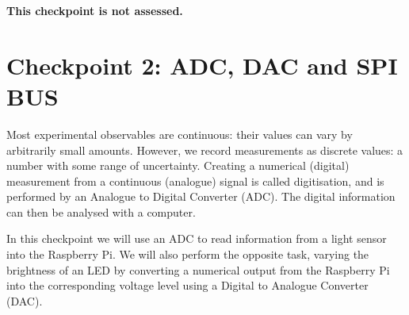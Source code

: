 {\bf This checkpoint is not assessed.}


\newpage
\section{Checkpoint 2: ADC, DAC and SPI BUS}

Most experimental observables are continuous: their values can vary by arbitrarily small amounts.
However, we record measurements as discrete values: a number with some range of uncertainty.
Creating a numerical (digital) measurement from a continuous (analogue) signal is called digitisation, and is performed by an Analogue to Digital Converter (ADC).
The digital information can then be analysed with a computer.

In this checkpoint we will use an ADC to read information from a light sensor into the Raspberry Pi.
We will also perform the opposite task, varying the brightness of an LED by converting a numerical output from the Raspberry Pi into the corresponding voltage level using a Digital to Analogue Converter (DAC).

